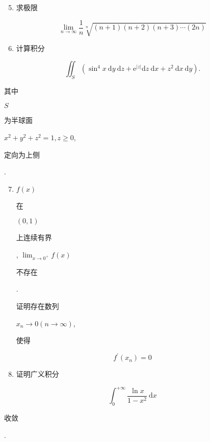 \documentclass[10pt]{article}
\begin{document}
\begin{enumerate}
  \setcounter{enumi}{4}
  \item \begin{CJK}{UTF8}{mj}求极限\end{CJK}
\end{enumerate}
$$
\lim _{n \rightarrow \infty} \frac{1}{n} \sqrt[n]{(n+1)(n+2)(n+3) \cdots(2 n)}
$$

\begin{enumerate}
  \setcounter{enumi}{5}
  \item \begin{CJK}{UTF8}{mj}计算积分\end{CJK}
\end{enumerate}
$$
\iint_{S}\left(\sin ^{4} x \mathrm{~d} y \mathrm{~d} z+\mathrm{e}^{|z|} \mathrm{d} z \mathrm{~d} x+z^{2} \mathrm{~d} x \mathrm{~d} y\right) .
$$
\begin{CJK}{UTF8}{mj}其中\end{CJK} $S$ \begin{CJK}{UTF8}{mj}为半球面\end{CJK} $x^{2}+y^{2}+z^{2}=1, z \geq 0$, \begin{CJK}{UTF8}{mj}定向为上侧\end{CJK}.

\begin{enumerate}
  \setcounter{enumi}{6}
  \item $f(x)$ \begin{CJK}{UTF8}{mj}在\end{CJK} $(0,1)$ \begin{CJK}{UTF8}{mj}上连续有界\end{CJK}, $\lim _{x \rightarrow 0^{+}} f(x)$ \begin{CJK}{UTF8}{mj}不存在\end{CJK}. \begin{CJK}{UTF8}{mj}证明存在数列\end{CJK} $x_{n} \rightarrow 0(n \rightarrow \infty)$, \begin{CJK}{UTF8}{mj}使得\end{CJK}
\end{enumerate}
$$
f^{\prime}\left(x_{n}\right)=0
$$

\begin{enumerate}
  \setcounter{enumi}{7}
  \item \begin{CJK}{UTF8}{mj}证明广义积分\end{CJK}
\end{enumerate}
$$
\int_{0}^{+\infty} \frac{\ln x}{1-x^{2}} \mathrm{~d} x
$$
\begin{CJK}{UTF8}{mj}收敛\end{CJK}.
\end{document}
